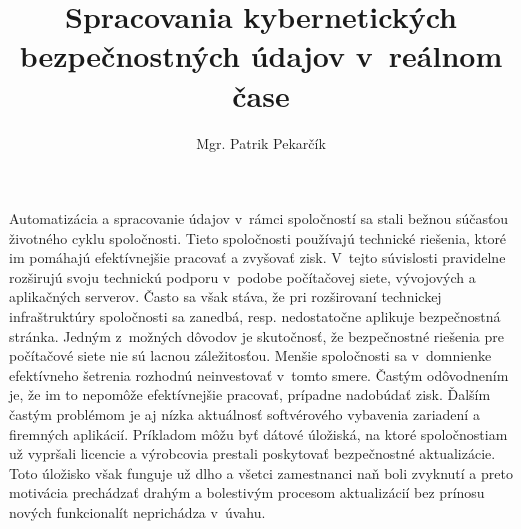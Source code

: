 \documentclass[thesismargins, thesislinespacing, openright, upjsfrontpage]{rnthesis}
\title{Spracovania kybernetických bezpečnostných údajov v reálnom čase}
\author{Mgr. Patrik Pekarčík}
\begin{document}
\maketitle
\tableofcontents

\uvod



% 

Automatizácia a spracovanie údajov v~rámci spoločností sa stali bežnou súčasťou životného cyklu spoločnosti. Tieto spoločnosti používajú technické riešenia, ktoré im pomáhajú efektívnejšie pracovať a zvyšovať zisk. V~tejto súvislosti pravidelne rozširujú svoju technickú podporu v~podobe počítačovej siete, vývojových a aplikačných serverov. Často sa však stáva, že pri rozširovaní technickej infraštruktúry spoločnosti sa zanedbá, resp. nedostatočne aplikuje bezpečnostná stránka. Jedným z~možných dôvodov je skutočnosť, že bezpečnostné riešenia pre počítačové siete nie sú lacnou záležitosťou. Menšie spoločnosti sa v~domnienke efektívneho šetrenia rozhodnú neinvestovať v~tomto smere. Častým odôvodnením je, že im to nepomôže efektívnejšie pracovať, prípadne nadobúdať zisk. Ďalším častým problémom je aj nízka aktuálnosť softvérového vybavenia zariadení a firemných aplikácií. Príkladom môžu byť dátové úložiská, na ktoré spoločnostiam už vypršali licencie a výrobcovia prestali poskytovať bezpečnostné aktualizácie. Toto úložisko však funguje už dlho a všetci zamestnanci naň boli zvyknutí a preto motivácia prechádzať drahým a bolestivým procesom aktualizácií bez prínosu nových funkcionalít neprichádza v~úvahu.
\end{document}
